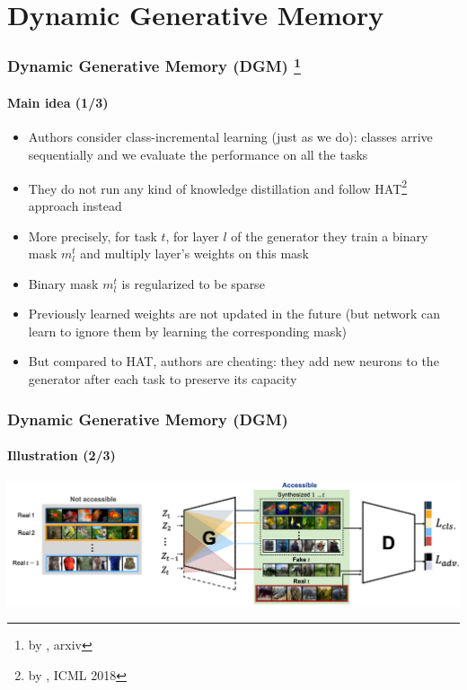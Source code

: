 \documentclass[10pt]{beamer}
\newcommand{\citepaper}[1]{\citetitle{#1} by \citeauthor{#1}}
\begin{document}
\section{Dynamic Generative Memory}
\begin{frame}
    \frametitle{Dynamic Generative Memory (DGM) \footnote{\citepaper{DGM}, arxiv}}
    \framesubtitle{Main idea (1/3)}
    
    \begin{itemize}
        \item Authors consider class-incremental learning (just as we do): classes arrive sequentially and we evaluate the performance on all the tasks
        \item They do not run any kind of knowledge distillation and follow HAT\footnote{\citepaper{HAT}, ICML 2018} approach instead
        \item More precisely, for task $t$, for layer $l$ of the generator they train a binary mask $m_l^t$ and multiply layer's weights on this mask
        \item Binary mask $m_l^t$ is regularized to be sparse
        \item Previously learned weights are not updated in the future (but network can learn to ignore them by learning the corresponding mask)
        \item But compared to HAT, authors are cheating: they add new neurons to the generator after each task to preserve its capacity
    \end{itemize}
\end{frame}

\begin{frame}
    \frametitle{Dynamic Generative Memory (DGM)}
    \framesubtitle{Illustration (2/3)}
    
    \centering
    \includegraphics[width=\textwidth]{images/dgm}
\end{frame}
\end{document}
